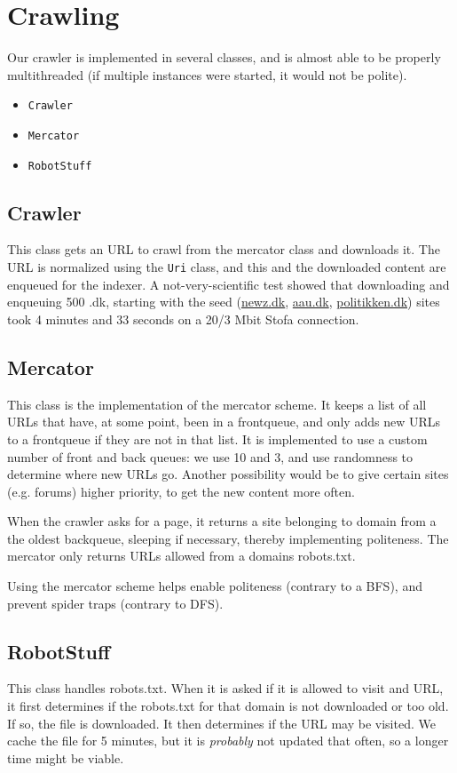 \section{Crawling}
Our crawler is implemented in several classes, and is almost able to be properly multithreaded (if multiple instances were started, it would not be polite).
\begin{itemize}
	\item \texttt{Crawler}
	\item \texttt{Mercator}
	\item \texttt{RobotStuff}
\end{itemize}

\subsection{Crawler}
This class gets an URL to crawl from the mercator class and downloads it. 
The URL is normalized using the \texttt{Uri} class, and this and the downloaded content are enqueued for the indexer.
A not-very-scientific test showed that downloading and enqueuing 500 .dk, starting with the seed (\url{newz.dk}, \url{aau.dk}, \url{politikken.dk}) sites took 4 minutes and 33 seconds on a 20/3 Mbit Stofa connection.

\subsection{Mercator}
This class is the implementation of the mercator scheme. It keeps a list of all URLs that have, at some point, been in a frontqueue, and only adds new URLs to a frontqueue if they are not in that list. It is implemented to use a custom number of front and back queues: we use 10 and 3, and use randomness to determine where new URLs go. Another possibility would be to give certain sites (e.g. forums) higher priority, to get the new content more often.

When the crawler asks for a page, it returns a site belonging to domain from a the oldest backqueue, sleeping if necessary, thereby implementing politeness. The mercator only returns URLs allowed from a domains robots.txt.

Using the mercator scheme helps enable politeness (contrary to a BFS), and prevent spider traps (contrary to DFS).

\subsection{RobotStuff}
This class handles robots.txt. When it is asked if it is allowed to visit and URL, it first determines if the robots.txt for that domain is not downloaded or too old. If so, the file is downloaded. It then determines if the URL may be visited. We cache the file for 5 minutes, but it is \emph{probably} not updated that often, so a longer time might be viable.